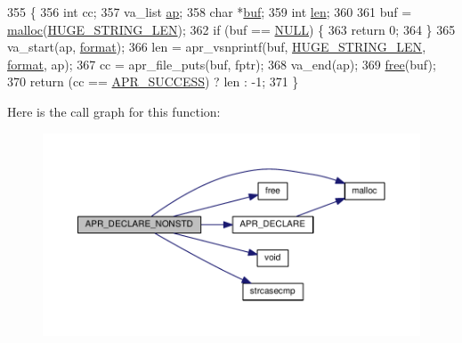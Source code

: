 \begin{DoxyCode}
355 \{
356     \textcolor{keywordtype}{int} cc;
357     va\_list \hyperlink{group__APR__Strings__Snprintf_ga21ecbc810cd93b85a818c96ca2f92f1a}{ap};
358     \textcolor{keywordtype}{char} *\hyperlink{group__APACHE__CORE__PROTO_ga17bc47ccf1b618ed082a4ff4f2cc7f7e}{buf};
359     \textcolor{keywordtype}{int} \hyperlink{group__APACHE__CORE__LOG_gab5a43233d60ef05c5b5bf5cba3d74468}{len};
360 
361     buf = \hyperlink{util__expr__parse_8c_a5faf6a2d99f50a4655dd390199a8db7b}{malloc}(\hyperlink{group__APACHE__CORE__DAEMON_ga0c9dd98f46b90b5bcd4cbf75e252d0da}{HUGE\_STRING\_LEN});
362     \textcolor{keywordflow}{if} (buf == \hyperlink{pcre_8txt_ad7f989d16aa8ca809a36bc392c07fba1}{NULL}) \{
363         \textcolor{keywordflow}{return} 0;
364     \}
365     va\_start(ap, \hyperlink{group__apr__file__io_ga34332e75afdd7ed8d280f2a09b4329ea}{format});
366     len = apr\_vsnprintf(buf, \hyperlink{group__APACHE__CORE__DAEMON_ga0c9dd98f46b90b5bcd4cbf75e252d0da}{HUGE\_STRING\_LEN}, \hyperlink{group__apr__file__io_ga34332e75afdd7ed8d280f2a09b4329ea}{format}, ap);
367     cc = apr\_file\_puts(buf, fptr);
368     va\_end(ap);
369     \hyperlink{util__expr__parse_8c_af07d89f5ceaea0c7c8252cc41fd75f37}{free}(buf);
370     \textcolor{keywordflow}{return} (cc == \hyperlink{group__apr__errno_ga9ee311b7bf1c691dc521d721339ee2a6}{APR\_SUCCESS}) ? len : -1;
371 \}
\end{DoxyCode}


Here is the call graph for this function\+:
\nopagebreak
\begin{figure}[H]
\begin{center}
\leavevmode
\includegraphics[width=350pt]{group__PoolCleanup_ga18235426bac93f23261221f9b3733bfd_cgraph}
\end{center}
\end{figure}




